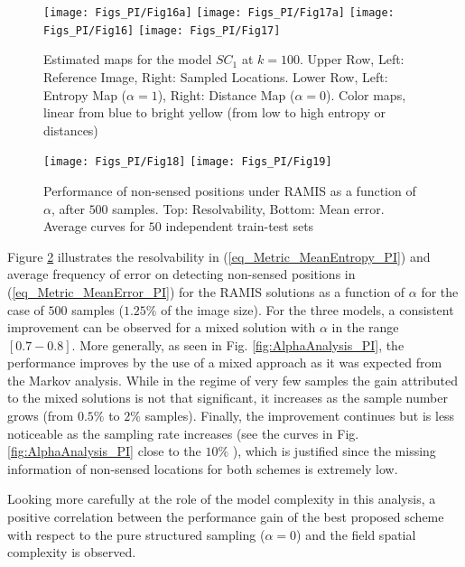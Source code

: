 \begin{figure}[!ht]
    \centering
		\texttt{[image: Figs\_PI/Fig16a]}
    \texttt{[image: Figs\_PI/Fig17a]}
    \texttt{[image: Figs\_PI/Fig16]}
    \texttt{[image: Figs\_PI/Fig17]}
	\caption[Estimated maps for the model $SC_1$ at $k = 100 $.]{\label{fig:Extremes_ObjFunction_PI} Estimated maps for the model $SC_1$ at $k = 100 $. Upper Row, Left: Reference Image, Right: Sampled Locations. Lower Row, Left: Entropy Map ($\alpha = 1$), Right: Distance Map ($\alpha = 0$). Color maps, linear from blue to bright yellow (from low to high entropy or distances)}
\end{figure}

\begin{figure}[!ht]
    \centering
    \texttt{[image: Figs\_PI/Fig18]}
    \texttt{[image: Figs\_PI/Fig19]}
	\caption[Performance of non-sensed positions under RAMIS as a function of $\alpha$]{\label{fig:Performance_Alpha_PI} Performance of non-sensed positions under RAMIS as a function of $\alpha$, after $500$ samples. Top: Resolvability, Bottom: Mean error. Average curves for $50$ independent train-test sets}
\end{figure}

Figure \ref{fig:Performance_Alpha_PI} illustrates the resolvability in (\ref{eq_Metric_MeanEntropy_PI}) and average frequency of error on detecting non-sensed positions in (\ref{eq_Metric_MeanError_PI}) for the RAMIS solutions as a function of $\alpha$ for the case of $500$ samples ($1.25\%$ of the image size). For the three models, a consistent improvement can be observed for a mixed solution  with $\alpha$ in the range $[0.7-0.8]$. More generally, as seen in Fig. \ref{fig:AlphaAnalysis_PI}, the performance improves by the use of a mixed approach as it was expected from the Markov analysis. While in the regime of very few samples the gain attributed to the mixed solutions is not that significant, it increases as the sample number grows (from $0.5\%$ to $2\%$ samples). Finally, the improvement continues but is less noticeable as the sampling rate increases (see the curves in Fig. \ref{fig:AlphaAnalysis_PI} close to the  $10\%$ ), which is justified since the missing information of non-sensed locations for both schemes is extremely low. 

Looking more carefully at the role of the model complexity in this analysis, a positive correlation between the performance gain of the best proposed scheme with respect to the pure structured sampling ($\alpha=0$) and the field spatial complexity is observed. 

